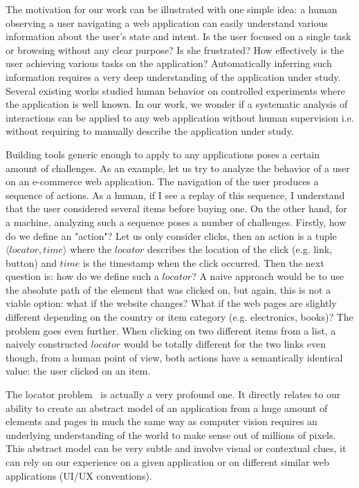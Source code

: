 The motivation for our work can be illustrated with one simple idea: a human observing a user navigating a web application can easily understand various information about the user's state and intent. Is the user focused on a single task or browsing without any clear purpose? Is she frustrated? How effectively is the user achieving various tasks on the application?
Automatically inferring such information requires a very deep understanding of the application under study. Several existing works studied human behavior on controlled experiments where the application is well known. In our work, we wonder if a systematic analysis of interactions can be applied to any web application without human supervision i.e. without requiring to manually describe the application under study.

Building tools generic enough to apply to any applications poses a certain amount of challenges. As an example, let us try to analyze the behavior of a user on an e-commerce web application. The navigation of the user produces a sequence of actions.
As a human, if I see a replay of this sequence, I understand that the user considered several items before buying one. On the other hand, for a machine, analyzing such a sequence poses a number of challenges.
Firstly, how do we define an "action"? Let us only consider clicks, then an action is a tuple $\langle locator, time \rangle$ where the $locator$ describes the location of the click (e.g. link, button) and $time$ is the timestamp when the click occurred. Then the next question is: how do we define such a $locator$? A naive approach would be to use the absolute path of the element that was clicked on, but again, this is not a viable option: what if the website changes? What if the web pages are slightly different depending on the country or item category (e.g. electronics, books)? 
The problem goes even further. When clicking on two different items from a list, a naively constructed $locator$ would be totally different for the two links even though, from a human point of view, both actions have a semantically identical value: the user clicked on an item.

The locator problem~\cite{hammoudi2016record} is actually a very profound one. It directly relates to our ability to create an abstract model of an application from a huge amount of elements and pages in much the same way as computer vision requires an underlying understanding of the world to make sense out of millions of pixels. This abstract model can be very subtle and involve visual or contextual clues, it can rely on our experience on a given application or on different similar web applications (UI/UX conventions).

